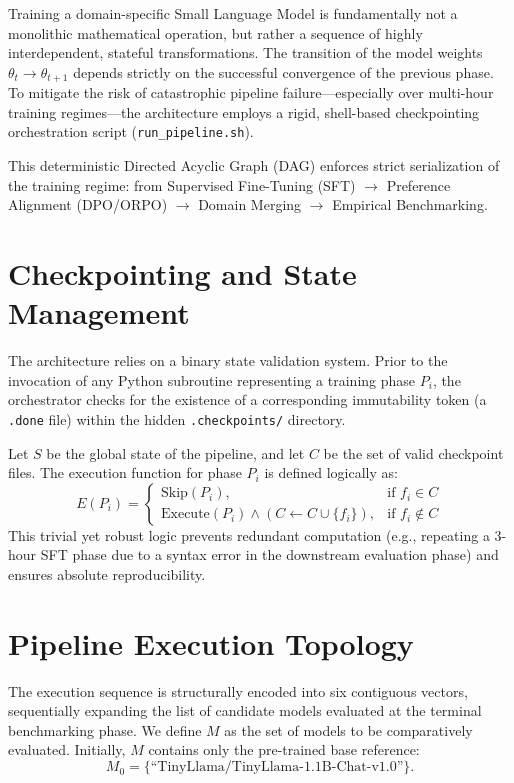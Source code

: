 \documentclass[12pt,a4paper]{report}
\begin{document}
Training a domain-specific Small Language Model is fundamentally not a monolithic mathematical operation, but rather a sequence of highly interdependent, stateful transformations. The transition of the model weights $\theta_{t} \to \theta_{t+1}$ depends strictly on the successful convergence of the previous phase. To mitigate the risk of catastrophic pipeline failure---especially over multi-hour training regimes---the architecture employs a rigid, shell-based checkpointing orchestration script (\texttt{run_pipeline.sh}). 

This deterministic Directed Acyclic Graph (DAG) enforces strict serialization of the training regime: from Supervised Fine-Tuning (SFT) $\to$ Preference Alignment (DPO/ORPO) $\to$ Domain Merging $\to$ Empirical Benchmarking.

\section{Checkpointing and State Management}

The architecture relies on a binary state validation system. Prior to the invocation of any Python subroutine representing a training phase $P_i$, the orchestrator checks for the existence of a corresponding immutability token (a \texttt{.done} file) within the hidden \texttt{.checkpoints/} directory.

Let $S$ be the global state of the pipeline, and let $C$ be the set of valid checkpoint files. The execution function for phase $P_i$ is defined logically as:
\begin{equation}
    E(P_i) = 
    \begin{cases} 
      \text{Skip}(P_i), & \text{if } f_{i} \in C \\
      \text{Execute}(P_i) \land (C \gets C \cup \{f_i\}), & \text{if } f_{i} \notin C
    \end{cases}
\end{equation}
This trivial yet robust logic prevents redundant computation (e.g., repeating a 3-hour SFT phase due to a syntax error in the downstream evaluation phase) and ensures absolute reproducibility.

\section{Pipeline Execution Topology}

The execution sequence is structurally encoded into six contiguous vectors, sequentially expanding the list of candidate models evaluated at the terminal benchmarking phase. We define $M$ as the set of models to be comparatively evaluated. Initially, $M$ contains only the pre-trained base reference:
\begin{equation}
    M_{0} = \{\text{``TinyLlama/TinyLlama-1.1B-Chat-v1.0''}\}. 
\end{equation}
\end{document}
